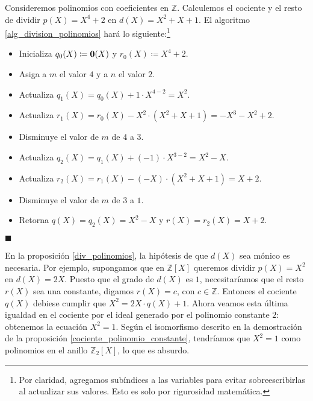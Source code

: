 \begin{example} \label{ejemplo_division_polinomios}
Consideremos polinomios con coeficientes en $\mathbb{Z}$. Calculemos el cociente y el resto de dividir $p(X) = X^4+2$ en $d(X) = X^2+X+1$. El algoritmo \ref{alg_division_polinomios} hará lo siguiente:\footnote{Por claridad, agregamos subíndices a las variables para evitar sobreescribirlas al actualizar sus valores. Esto es solo por rigurosidad matemática.}
\begin{itemize}
\item Inicializa $q_0(X) \coloneqq \mathbf{0}(X)$ y $r_0(X) \coloneqq X^4+2$.
\item Asiga a $m$ el valor $4$ y a $n$ el valor $2$.
\item Actualiza $q_1(X) = q_0(X) + 1 \cdot X^{4-2} = X^2$.
\item Actualiza $r_1(X) = r_0(X) - X^2 \cdot (X^2+X+1) = -X^3 - X^2 + 2$.
\item Disminuye el valor de $m$ de $4$ a $3$.
\item Actualiza $q_2(X) = q_1(X) + (-1) \cdot X^{3-2} = X^2 - X$.
\item Actualiza $r_2(X) = r_1(X) - (-X) \cdot (X^2+X+1) = X + 2$.
\item Disminuye el valor de $m$ de $3$ a $1$.
\item Retorna $q(X) = q_2(X) = X^2-X$ y $r(X) = r_2(X) = X+2$.
\end{itemize}
\hfill$\blacksquare$
\end{example}

En la proposición \ref{div_polinomios}, la hipótesis de que $d(X)$ sea mónico es necesaria. Por ejemplo, supongamos que en $\mathbb{Z}[X]$ queremos dividir $p(X) = X^2$ en $d(X) = 2X$. Puesto que el grado de $d(X)$ es $1$, necesitaríamos que el resto $r(X)$ sea una constante, digamos $r(X) = c$, con $c \in \mathbb{Z}$. Entonces el cociente $q(X)$ debiese cumplir que
$X^2 = 2X \cdot q(X) + 1$. Ahora veamos esta última igualdad en el cociente por el ideal generado por el polinomio constante $2$: obtenemos la ecuación $X^2 = 1$. Según el isomorfismo descrito en la demostración de la proposición \ref{cociente_polinomio_constante}, tendríamos que $X^2 = 1$ como polinomios en el anillo $\mathbb{Z}_2[X]$, lo que es absurdo.